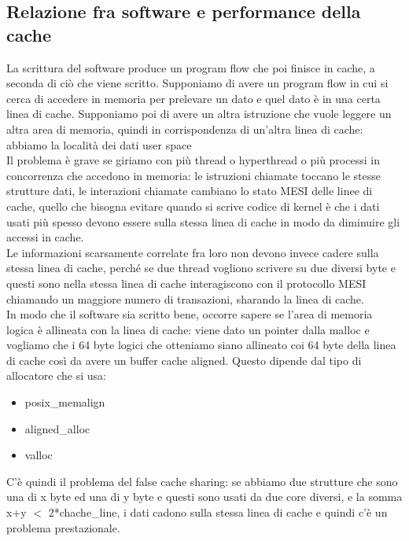 \documentclass[14pt, oneside]{book}
\begin{document}
\subsection{Relazione fra software e performance della cache}
La scrittura del software produce un program flow che poi finisce in cache, a seconda di ciò che viene scritto. Supponiamo di avere un program flow in cui si cerca di accedere in memoria per prelevare un dato e quel dato è in una certa linea di cache. Supponiamo poi di avere un altra istruzione che vuole leggere un altra area di memoria, quindi in corrispondenza di un'altra linea di cache: abbiamo la località dei dati user space\\ Il problema è grave se giriamo con più thread o hyperthread o più processi in concorrenza che accedono in memoria: le istruzioni chiamate toccano le stesse strutture dati, le interazioni chiamate cambiano lo stato MESI delle linee di cache, quello che bisogna evitare quando si scrive codice di kernel è che i dati usati più spesso devono essere sulla stessa linea di cache in modo da diminuire gli accessi in cache.\\ Le informazioni scarsamente correlate fra loro non devono invece cadere sulla stessa linea di cache, perché se due thread vogliono scrivere su due diversi byte e questi sono nella stessa linea di cache interagiscono con il protocollo MESI chiamando un maggiore numero di transazioni, sharando la linea di cache.\\ In modo che il software sia scritto bene, occorre sapere se l'area di memoria logica è allineata con la linea di cache: viene dato un pointer dalla malloc e vogliamo che i 64 byte logici che otteniamo siano allineato coi 64 byte della linea di cache così da avere un buffer cache aligned. Questo dipende dal tipo di allocatore che si usa:
\begin{itemize}
\item \textsf{posix\_memalign }
\item \textsf{aligned\_alloc }
\item \textsf{valloc }
\end{itemize}
C'è quindi il problema del false cache sharing: se abbiamo due strutture che sono una di x byte ed una di y byte e questi sono usati da due core diversi, e la somma x+y $<$ 2*chache\_line, i dati cadono sulla stessa linea di cache e quindi c'è un problema prestazionale.\\ 
\end{document}
